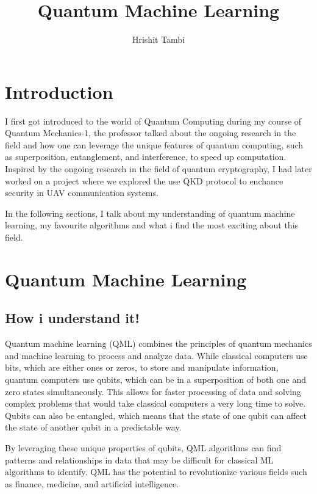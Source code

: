 \documentclass{article}
\title{Quantum Machine Learning}
\author{Hrishit Tambi}
\begin{document}
\maketitle

\section{Introduction}

I first got introduced to the world of Quantum Computing during my course of Quantum Mechanics-1, the professor talked about the ongoing research in the field and how one can leverage the unique features of quantum computing, such as superposition, entanglement, and interference, to speed up computation. 
Inspired by the ongoing research in the field of quantum cryptography, I had later worked on a project where we explored the use QKD protocol to enchance security in UAV communication systems.

In the following sections, I talk about my understanding of quantum machine learning, my favourite algorithms and what i find the most exciting about this field.

\section{Quantum Machine Learning}

\subsection{How i understand it!}

Quantum machine learning (QML) combines the principles of quantum mechanics and machine learning to process and analyze data. While classical computers use bits, which are either ones or zeros, to store and manipulate information, quantum computers use qubits, which can be in a superposition of both one and zero states simultaneously. This allows for faster processing of data and solving complex problems that would take classical computers a very long time to solve. Qubits can also be entangled, which means that the state of one qubit can affect the state of another qubit in a predictable way.

By leveraging these unique properties of qubits, QML algorithms can find patterns and relationships in data that may be difficult for classical ML algorithms to identify. QML has the potential to revolutionize various fields such as finance, medicine, and artificial intelligence.
\end{document}
